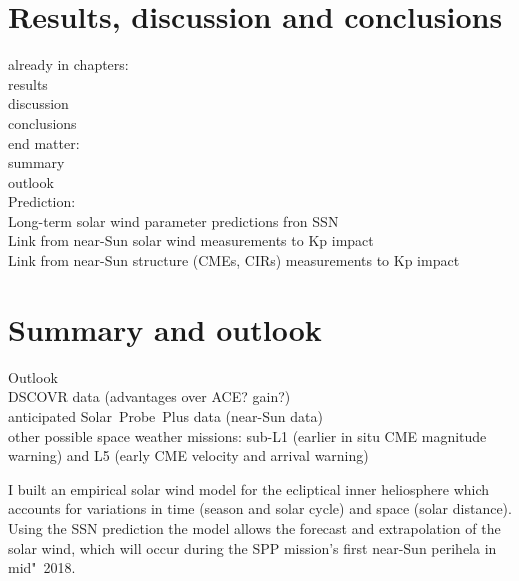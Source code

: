 \chapter[Results+conclusions]{Results, discussion and conclusions}
\label{chap:summary}

already in chapters:\\
results\\
discussion\\
conclusions\\

end matter:\\
summary\\
outlook\\

Prediction:\\
Long-term solar wind parameter predictions fron SSN\\
Link from near-Sun solar wind measurements to Kp impact\\
Link from near-Sun structure (CMEs, CIRs) measurements to Kp impact\\


\chapter{Summary and outlook}


Outlook\\
DSCOVR data (advantages over ACE? gain?)\\
anticipated Solar~Probe~Plus data (near-Sun data)\\

other possible space weather missions: sub-L1 (earlier in situ CME magnitude warning) and L5 (early CME velocity and arrival warning)


I built an empirical solar wind model for the ecliptical inner heliosphere which accounts for variations in time (season and solar cycle) and space (solar distance).\\

Using the SSN prediction the model allows the forecast and extrapolation of the solar wind, which will occur during the SPP mission's first near-Sun perihela in mid"~2018.\\



